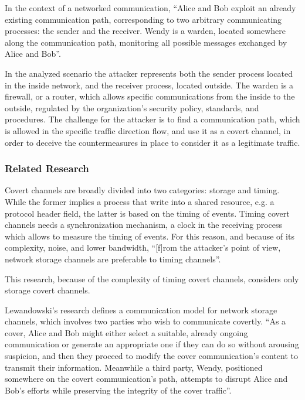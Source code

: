 \documentclass[12pt]{article}
\begin{document}
In the context of a networked communication, ``Alice and Bob exploit an already existing communication path, corresponding to two arbitrary communicating processes: the sender and the receiver. Wendy is a warden, located somewhere along the communication path, monitoring all possible messages exchanged by Alice and Bob''\cite{lewandowski}.

In the analyzed scenario the attacker represents both the sender process located in the inside network, and the receiver process, located outside. The warden is a firewall, or a router, which allows specific communications from the inside to the outside, regulated by the organization's security policy, standards, and procedures. The challenge for the attacker is to find a communication path, which is allowed in the specific traffic direction flow, and use it as a covert channel, in order to deceive the countermeasures in place to consider it as a legitimate traffic.




\subsubsection{Related Research}

Covert channels are broadly divided into two categories: storage and timing. While the former implies a process that write into a shared resource, e.g. a protocol header field, the latter is based on the timing of events. Timing covert channels needs a synchronization mechanism, a clock in the receiving process which allows to measure the timing of events. For this reason, and because of its complexity, noise, and lower bandwidth, ``[f]rom the attacker's point of view, network storage channels are preferable to timing channels''\cite{milevaPanajotov}. 

This research, because of the complexity of timing covert channels, considers only storage covert channels.

Lewandowski's research defines a communication model for network storage channels, which involves two parties who wish to communicate covertly. ``As a cover, Alice and Bob might either select a suitable, already ongoing communication or generate an appropriate one if they can do so without arousing suspicion, and then they proceed to modify the cover communication’s content to transmit their information. Meanwhile a third party, Wendy, positioned somewhere on the covert communication’s path, attempts to disrupt Alice and Bob’s efforts while preserving the integrity of the cover traffic''\cite{lewandowski}.
\end{document}
